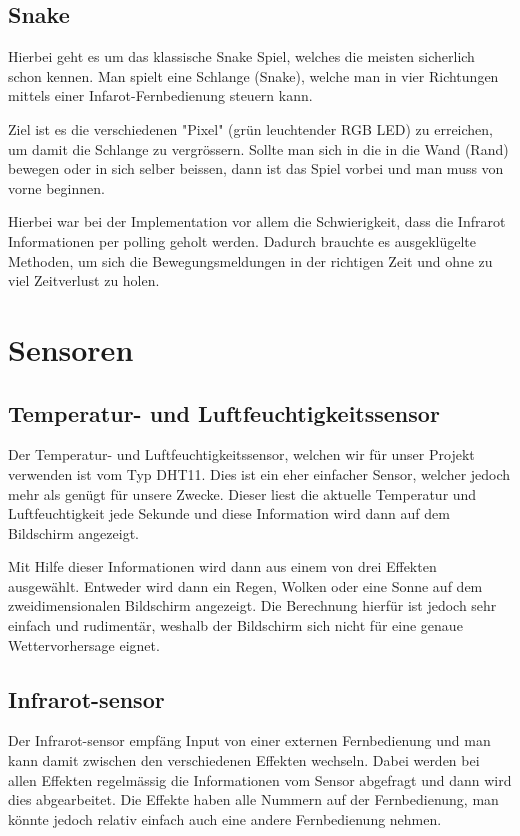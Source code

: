 \documentclass[12pt,a4paper]{article}
\begin{document}
\subsection{Snake}

Hierbei geht es um das klassische Snake Spiel, welches die meisten sicherlich schon kennen\cite{snake}.
Man spielt eine Schlange (Snake), welche man in vier Richtungen mittels einer Infarot-Fernbedienung steuern kann.

Ziel ist es die verschiedenen "Pixel" (grün leuchtender RGB LED) zu erreichen, um damit die Schlange zu vergrössern. Sollte man sich in die in die Wand (Rand) bewegen oder in sich selber beissen, dann ist das Spiel vorbei und man muss von vorne beginnen.

Hierbei war bei der Implementation vor allem die Schwierigkeit, dass die Infrarot Informationen per polling geholt werden. Dadurch brauchte es ausgeklügelte Methoden, um sich die Bewegungsmeldungen in der richtigen Zeit und ohne zu viel Zeitverlust zu holen.

\section{Sensoren}

\subsection{Temperatur- und Luftfeuchtigkeitssensor}

Der Temperatur- und Luftfeuchtigkeitssensor, welchen wir für unser Projekt verwenden ist vom Typ DHT11. Dies ist ein eher einfacher Sensor, welcher jedoch mehr als genügt für unsere Zwecke. Dieser liest die aktuelle Temperatur und Luftfeuchtigkeit jede Sekunde und diese Information wird dann auf dem Bildschirm angezeigt. 

Mit Hilfe dieser Informationen wird dann aus einem von drei Effekten ausgewählt. Entweder wird dann ein Regen, Wolken oder eine Sonne auf dem zweidimensionalen Bildschirm angezeigt. Die Berechnung hierfür ist jedoch sehr einfach und rudimentär, weshalb der Bildschirm sich nicht für eine genaue Wettervorhersage eignet. 

\subsection{Infrarot-sensor}

Der Infrarot-sensor empfäng Input von einer externen Fernbedienung und man kann damit zwischen den verschiedenen Effekten wechseln. Dabei werden bei allen Effekten regelmässig die Informationen vom Sensor abgefragt und dann wird dies abgearbeitet. Die Effekte haben alle Nummern auf der Fernbedienung, man könnte jedoch relativ einfach auch eine andere Fernbedienung nehmen.
\end{document}
